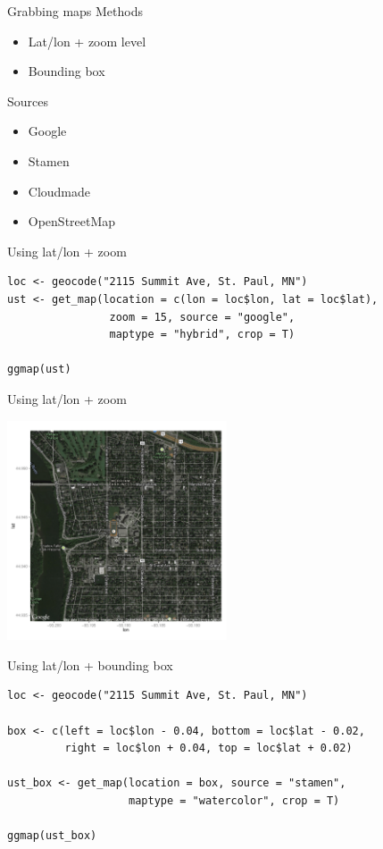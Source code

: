 \documentclass[sans,aspectratio=169,presentation,bigger,fleqn]{beamer}
\begin{document}
\begin{frame}[label=sec-3]{Grabbing maps}
Methods
\begin{itemize}
\item Lat/lon + zoom level
\item Bounding box
\end{itemize}

Sources
\begin{itemize}
\item Google
\item Stamen
\item Cloudmade
\item OpenStreetMap
\end{itemize}
\end{frame}
\begin{frame}[fragile,label=sec-4]{Using lat/lon + zoom}
 \begin{verbatim}
loc <- geocode("2115 Summit Ave, St. Paul, MN")
ust <- get_map(location = c(lon = loc$lon, lat = loc$lat),
                zoom = 15, source = "google",
                maptype = "hybrid", crop = T)

ggmap(ust)
\end{verbatim}
\end{frame}
\begin{frame}[label=sec-5]{Using lat/lon + zoom}
\begin{center}
\includegraphics[height=6.5cm]{./img/ust-coords-zoom.pdf}
\end{center}
\end{frame}
\begin{frame}[fragile,label=sec-6]{Using lat/lon + bounding box}
 \begin{verbatim}
loc <- geocode("2115 Summit Ave, St. Paul, MN")

box <- c(left = loc$lon - 0.04, bottom = loc$lat - 0.02,
         right = loc$lon + 0.04, top = loc$lat + 0.02)

ust_box <- get_map(location = box, source = "stamen",
                   maptype = "watercolor", crop = T)

ggmap(ust_box)
\end{verbatim}
\end{frame}
\end{document}
